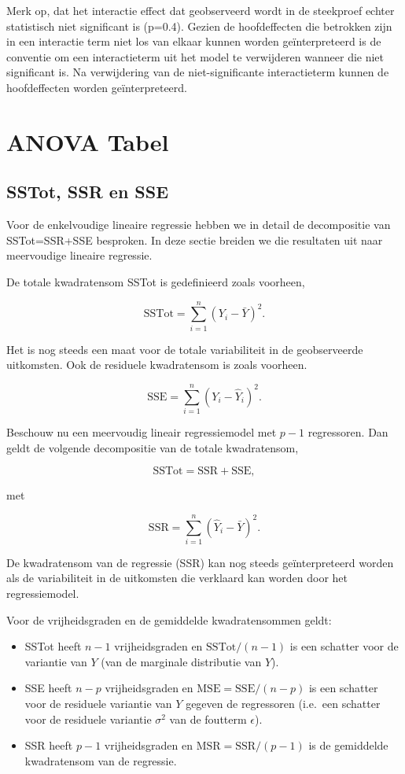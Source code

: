 \documentclass[
  12pt,dutch,coursenotes]{book}
\providecommand{\tightlist}{%
  \setlength{\itemsep}{0pt}\setlength{\parskip}{0pt}}
\begin{document}
Merk op, dat het interactie effect dat geobserveerd wordt in de steekproef echter statistisch niet significant is (p=0.4).
Gezien de hoofdeffecten die betrokken zijn in een interactie term niet los van elkaar kunnen worden geïnterpreteerd is de conventie om een interactieterm uit het model te verwijderen wanneer die niet significant is. Na verwijdering van de niet-significante interactieterm kunnen de hoofdeffecten worden geïnterpreteerd.

\hypertarget{anova-tabel-2}{%
\section{ANOVA Tabel}\label{anova-tabel-2}}

\hypertarget{sstot-ssr-en-sse}{%
\subsection{SSTot, SSR en SSE}\label{sstot-ssr-en-sse}}

Voor de enkelvoudige lineaire regressie hebben we in detail de decompositie van SSTot=SSR+SSE besproken. In deze sectie breiden we die resultaten uit naar meervoudige lineaire regressie.

De totale kwadratensom SSTot is gedefinieerd zoals voorheen,

\[
  \text{SSTot} = \sum_{i=1}^n (Y_i - \bar{Y})^2.
\]

Het is nog steeds een maat voor de totale variabiliteit in de geobserveerde uitkomsten.
Ook de residuele kwadratensom is zoals voorheen.

\[
  \text{SSE} = \sum_{i=1}^n (Y_i-\hat{Y}_i)^2.
\]

Beschouw nu een meervoudig lineair regressiemodel met \(p-1\) regressoren. Dan geldt de volgende decompositie van de totale kwadratensom,

\[
  \text{SSTot} = \text{SSR} + \text{SSE} ,
\]

met

\[
  \text{SSR} = \sum_{i=1}^n (\hat{Y}_i-\bar{Y})^2.
\]

De kwadratensom van de regressie (SSR) kan nog steeds geïnterpreteerd worden als de variabiliteit in de uitkomsten die verklaard kan worden door het regressiemodel.

Voor de vrijheidsgraden en de gemiddelde kwadratensommen geldt:

\begin{itemize}
\tightlist
\item
  SSTot heeft \(n-1\) vrijheidsgraden en \(\text{SSTot}/(n-1)\) is een schatter voor de variantie van \(Y\) (van de marginale distributie van \(Y\)).
\item
  SSE heeft \(n-p\) vrijheidsgraden en \(\text{MSE}=\text{SSE}/(n-p)\) is een schatter voor de residuele variantie van \(Y\) gegeven de regressoren (i.e.~een schatter voor de residuele variantie \(\sigma^2\) van de foutterm \(\epsilon\)).
\item
  SSR heeft \(p-1\) vrijheidsgraden en \(\text{MSR}=\text{SSR}/(p-1)\) is de gemiddelde kwadratensom van de regressie.
\end{itemize}
\end{document}
